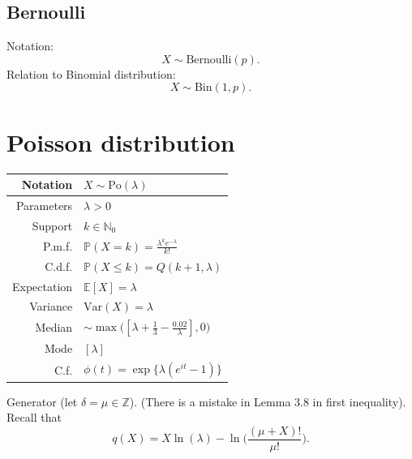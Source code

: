 \documentclass[a4paper,11pt]{article}
\theoremstyle{plain}
\theoremstyle{definition}
\newcommand{\ME}{\mathbb{E}}
\newcommand{\MP}{\mathbb{P}}
\newcommand{\MN}{\mathbb{N}}
\newcommand{\Var}{\mathrm{Var}}
\begin{document}
	\subsection{Bernoulli}
	Notation:
	\[ X \sim \mathrm{Bernoulli}(p). \]
	Relation to Binomial distribution: \[X \sim \mathrm{Bin}(1, p). \]
	\section{Poisson distribution}
	\begin{center}
		\begin{tabular}{| r | l |}
			\hline
			Notation & $ X \sim \mathrm{Po}(\lambda) $ \\
			\hline
			Parameters & $\lambda > 0$ \\
			\hline
			Support & $ k \in \MN_0 $  \\
			\hline
			P.m.f. & $\MP(X = k) = \frac{\lambda^k e^{-\lambda}}{k!}$ \\
			\hline
			C.d.f. & $\MP(X \leq k)=Q(k+1, \lambda)$ \\
			\hline
			Expectation & $\ME[X] = \lambda$ \\
			\hline
			Variance & $\Var(X) = \lambda$ \\
			\hline
			Median & $\sim \max\big([\lambda + \frac{1}{3} - \frac{0.02}{\lambda}], 0\big) $ \\
			\hline
			Mode & $[\lambda]$ \\
			\hline
			C.f. & $\phi(t) = \exp \{ \lambda(e^{it}-1) \}  $ \\
			\hline
		\end{tabular}
	\end{center}
	
	Generator (let $\delta = \mu \in \mathbb{Z}$). (There is a mistake in Lemma 3.8 in first inequality). Recall that
	\[ q(X) = X \ln(\lambda) - \ln \Big( \frac{(\mu + X)!}{\mu!} \Big). \]
	
\end{document}
